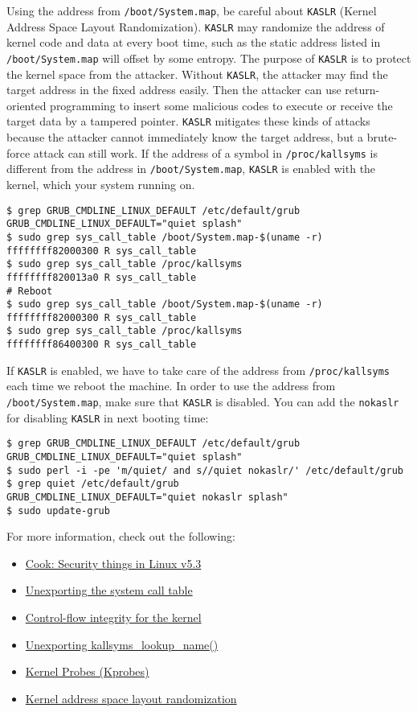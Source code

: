 \documentclass[10pt, oneside]{book}
\begin{document}
Using the address from \verb|/boot/System.map|, be careful about \verb|KASLR| (Kernel Address Space Layout Randomization).
\verb|KASLR| may randomize the address of kernel code and data at every boot time, such as the static address listed in \verb|/boot/System.map| will offset by some entropy.
The purpose of \verb|KASLR| is to protect the kernel space from the attacker.
Without \verb|KASLR|, the attacker may find the target address in the fixed address easily.
Then the attacker can use return-oriented programming to insert some malicious codes to execute or receive the target data by a tampered pointer.
\verb|KASLR| mitigates these kinds of attacks because the attacker cannot immediately know the target address, but a brute-force attack can still work.
If the address of a symbol in \verb|/proc/kallsyms| is different from the address in \verb|/boot/System.map|, \verb|KASLR| is enabled with the kernel, which your system running on.
\begin{verbatim}
$ grep GRUB_CMDLINE_LINUX_DEFAULT /etc/default/grub
GRUB_CMDLINE_LINUX_DEFAULT="quiet splash"
$ sudo grep sys_call_table /boot/System.map-$(uname -r)
ffffffff82000300 R sys_call_table
$ sudo grep sys_call_table /proc/kallsyms
ffffffff820013a0 R sys_call_table
# Reboot
$ sudo grep sys_call_table /boot/System.map-$(uname -r)
ffffffff82000300 R sys_call_table
$ sudo grep sys_call_table /proc/kallsyms
ffffffff86400300 R sys_call_table
\end{verbatim}
If \verb|KASLR| is enabled, we have to take care of the address from \verb|/proc/kallsyms| each time we reboot the machine.
In order to use the address from \verb|/boot/System.map|, make sure that \verb|KASLR| is disabled.
You can add the \verb|nokaslr| for disabling \verb|KASLR| in next booting time:
\begin{verbatim}
$ grep GRUB_CMDLINE_LINUX_DEFAULT /etc/default/grub
GRUB_CMDLINE_LINUX_DEFAULT="quiet splash"
$ sudo perl -i -pe 'm/quiet/ and s//quiet nokaslr/' /etc/default/grub
$ grep quiet /etc/default/grub
GRUB_CMDLINE_LINUX_DEFAULT="quiet nokaslr splash"
$ sudo update-grub
\end{verbatim}

For more information, check out the following:

\begin{itemize}
 \item \href{https://lwn.net/Articles/804849/}{Cook: Security things in Linux v5.3}
 \item \href{https://lwn.net/Articles/12211/}{Unexporting the system call table}
 \item \href{https://lwn.net/Articles/810077/}{Control-flow integrity for the kernel}
 \item \href{https://lwn.net/Articles/813350/}{Unexporting kallsyms\_lookup\_name()}
 \item \href{https://www.kernel.org/doc/Documentation/kprobes.txt}{Kernel Probes (Kprobes)}
 \item \href{https://lwn.net/Articles/569635/}{Kernel address space layout randomization}
\end{itemize}
\end{document}
